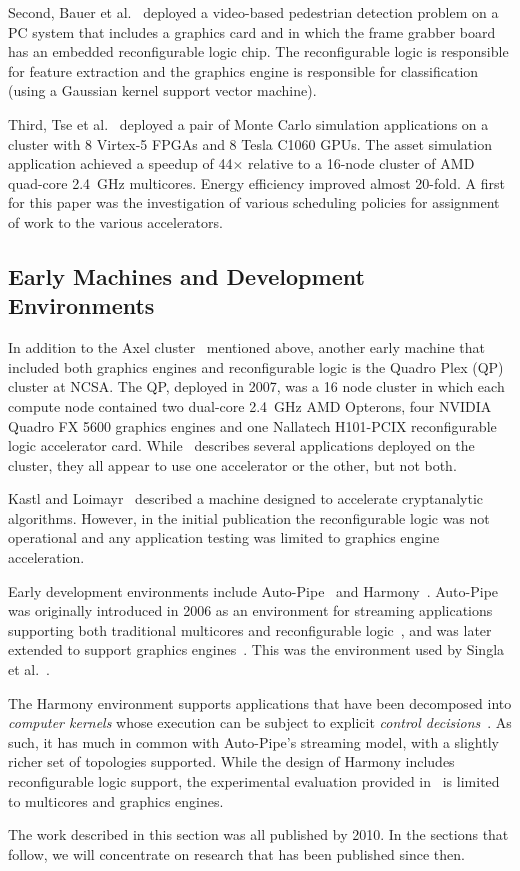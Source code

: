 Second, Bauer et al.~\cite{bkdb10} deployed a video-based pedestrian
detection problem on a PC system that includes a graphics card and
in which the frame grabber board has an embedded reconfigurable logic chip.
The reconfigurable logic is responsible for feature extraction and the
graphics engine is responsible for classification (using a Gaussian
kernel support vector machine).

Third, Tse et al.~\cite{tttl10} deployed a pair of Monte Carlo simulation
applications on a cluster with 8 Virtex-5 FPGAs and 8 Tesla C1060 GPUs.
The asset simulation application achieved a speedup of 44$\times$ relative
to a 16-node cluster of AMD quad-core 2.4~GHz multicores.  Energy efficiency
improved almost 20-fold.
A first for this paper was the investigation of various scheduling policies
for assignment of work to the various accelerators.

\subsection{Early Machines and Development Environments}

In addition to the Axel cluster~\cite{tl10} mentioned above, another
early machine that included both graphics engines and reconfigurable
logic is the Quadro Plex (QP)~\cite{sep+09} cluster at NCSA.
The QP, deployed in 2007,
was a 16 node cluster in which each compute node contained two
dual-core 2.4~GHz AMD Opterons, four NVIDIA Quadro FX 5600 graphics
engines and one Nallatech H101-PCIX reconfigurable logic accelerator card.
While~\cite{sep+09} describes several applications deployed on the cluster,
they all appear to use one accelerator or the other, but not both.

Kastl and Loimayr~\cite{kl10} described a machine designed to accelerate
cryptanalytic algorithms.  However, in the initial publication the
reconfigurable logic was not operational and any application testing
was limited to graphics engine acceleration.

Early development environments include Auto-Pipe~\cite{ftb+06,cft+10}
and Harmony~\cite{dy08}.  Auto-Pipe was originally introduced in 2006
as an environment for streaming applications supporting both traditional
multicores and reconfigurable logic~\cite{ftb+06}, and was later extended
to support graphics engines~\cite{cft+10}. This was the environment
used by Singla et al.~\cite{shsc08}.

The Harmony environment supports applications that have been decomposed into
\emph{computer kernels} whose execution can be subject to explicit
\emph{control decisions}~\cite{dy08}.
As such, it has much in common with Auto-Pipe's
streaming model, with a slightly richer set of topologies supported.
While the design of Harmony includes reconfigurable logic support, the
experimental evaluation provided in~\cite{dy08} is limited to multicores
and graphics engines.

The work described in this section was all published by 2010. In the
sections that follow, we will concentrate on research that has been
published since then.
